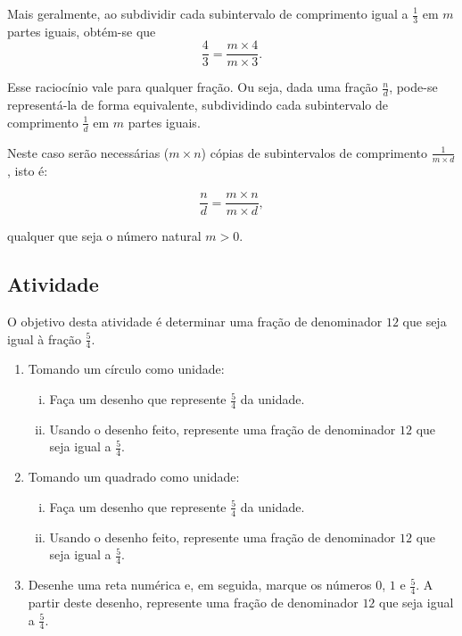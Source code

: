 \begin{refletindo*}
Mais geralmente, ao subdividir cada subintervalo de comprimento igual a $\frac{1}{3}$ em $m$ partes iguais, obtém-se que
$$\dfrac{4}{3} = \dfrac{m \times 4}{m \times 3}.$$

Esse raciocínio vale para qualquer fração. Ou seja, dada uma fração $\frac{n}{d}$, pode-se representá-la de forma equivalente, subdividindo cada subintervalo de comprimento $\frac{1}{d}$ em $m$ partes iguais.

Neste caso serão necessárias ($m \times n$) cópias de subintervalos de comprimento $\frac{1}{m \times d}$, isto é:

$$\dfrac{n}{d} = \dfrac{m \times n}{m \times d},$$

qualquer que seja o número natural $m > 0$.

\end{refletindo*}

\subsection{Atividade}

O objetivo desta atividade é determinar uma fração de denominador $12$ que seja igual à fração $\frac{5}{4}$.

\begin{enumerate} [\quad a)] %
  \item     Tomando um círculo como unidade:
\begin{enumerate}[(i)]
  \item Faça um desenho que represente     $\frac{5}{4}$ da unidade.
  \item Usando o desenho feito, represente uma fração de denominador     $12$ que seja igual a     $\frac{5}{4}$.
\end{enumerate}
  \item     Tomando um quadrado como unidade:
  \begin{enumerate}[(i)]
  \item Faça um desenho que represente     $\frac{5}{4}$ da unidade.
  \item Usando o desenho feito, represente uma fração de denominador     $12$ que seja igual a     $\frac{5}{4}$.
  \end{enumerate}
\item     Desenhe uma reta numérica e, em seguida, marque os números     $0$,     $1$ e     $\frac{5}{4}$. A partir deste desenho, represente uma fração de denominador     $12$ que seja igual a     $\frac{5}{4}$.
\end{enumerate} %


